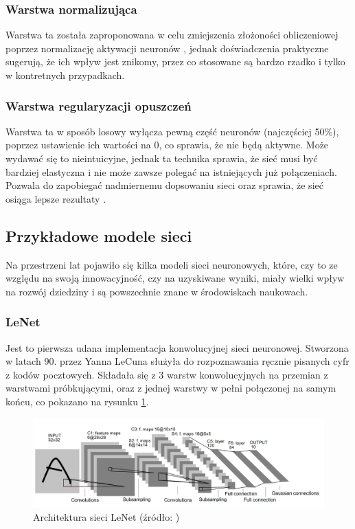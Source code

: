 \documentclass[a4paper,twoside,12pt]{book}
\begin{document}
{\subsubsection{Warstwa normalizująca}
{Warstwa ta została zaproponowana w celu zmiejszenia złożoności obliczeniowej poprzez normalizację aktywacji neuronów \cite{ba2016layer}, jednak doświadczenia praktyczne sugerują, że ich wpływ jest znikomy, przez co stosowane są bardzo rzadko i tylko w kontretnych przypadkach.}

\subsubsection{Warstwa regularyzacji opuszczeń}
{Warstwa ta w sposób losowy wyłącza pewną część neuronów (najczęściej 50\%), poprzez ustawienie ich wartości na 0, co sprawia, że nie będą aktywne. Może wydawać się to nieintuicyjne, jednak ta technika sprawia, że sieć musi być bardziej elastyczna i nie może zawsze polegać na istniejących już połączeniach. Pozwala do zapobiegać nadmiernemu dopsowaniu sieci oraz sprawia, że sieć osiąga lepsze rezultaty \cite{srivastava2014dropout,dahl2013improving,hinton2012improving}.}

\subsection{Przykładowe modele sieci}
{Na przestrzeni lat pojawiło się kilka modeli sieci neuronowych, które, czy to ze względu na swoją innowacyjność, czy na uzyskiwane wyniki, miały wielki wpływ na rozwój dziedziny i są powszechnie znane w środowiskach naukowach.}
\subsubsection{LeNet}
{Jest to pierwsza udana implementacja konwolucyjnej sieci neuronowej. Stworzona w latach 90. przez Yanna LeCuna służyła do rozpoznawania ręcznie pisanych cyfr z kodów pocztowych\cite{lecun1998gradient}. Składała się z 3 warstw konwolucyjnych na przemian z warstwami próbkującymi, oraz z jednej warstwy w pełni połączonej na samym końcu, co pokazano na rysunku \ref{LeNet}. }

\begin{figure}[h]


\centering
\includegraphics[scale=0.6]{le-net-5.png}
\caption{Architektura sieci LeNet (źródło: \cite{lecun1998gradient})}
\label{LeNet}
\end{figure}

}
\end{document}
